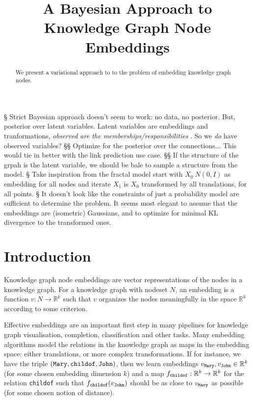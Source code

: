 \documentclass[11pt]{article}
\title{A Bayesian Approach to Knowledge Graph Node Embeddings}
\newcommand{\R}{{\mathbb R}}
\newcommand{\fw}[1]{\text{\texttt{#1}}}
\begin{document}
\begin{easylist}
§ Strict Bayesian approach doesn't seem to work: no data, no posterior. But, posterior over latent variables. Latent variables are embeddings and tranformations, \emph{observed are the memberships/responsibilities }. So we \emph{do} have observed variables?
§§ Optimize for the posterior over the connections... This would tie in better with the link prediction use case.  
§§ If the structure of the grpah is the latent variable, we should be bale to sample a structure from the model.
§ Take inspiration from the fractal model start with $X_0 ~ N(0, I)$ as embedding for all
nodes and iterate $X_1$ is $X_0$ transformed by all translations, for all points.
§ It doesn't look like the constraints of just a probability model are sufficient to determine the problem. It seems most elegant to assume that the embeddings are (isometric) Gaussians, and to optimize for minimal KL divergence to the transformed ones.

\end{easylist}



\maketitle

\begin{abstract}

	We present a variational approach to to the problem of embedding knowledge graph nodes.
\end{abstract}	

\section{Introduction}
Knowledge graph node embeddings are vector representations of the nodes in a knowledge graph. For a knowledge graph with nodeset $N$, an embedding is a function $v: N \to \R^k$ such that $v$ organizes the nodes meaningfully in the space $\R^k$ according to some criterion.

Effective embeddings are an important first step in many pipelines for knowledge graph visualisation, completion, classification and other tasks. Many embedding algorithms model the relations in the knowledge graph as maps in the embedding space: either translations, or more complex transformations. If for instance, we have the triple $(\fw{Mary}, \fw{childof}, \fw{John})$, then we learn embeddings $v_\fw{Mary}, v_\fw{John} \in \R^k$  (for some chosen embedding dimension $k$) and a map $f_\fw{childof} : \R^k \to \R^k$ for the relation \texttt{childof} such that $f_\fw{childof}(v_\fw{John})$ should be as close to $v_\fw{Mary}$ as possible (for some chosen notion of distance).
\end{document}
